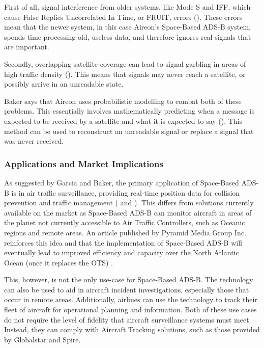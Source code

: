 \documentclass[stu, a4paper, 12pt, floatsintext]{apa7}
\numberwithin{figure}{section}
\numberwithin{table}{section}
\numberwithin{equation}{section}
\begin{document}
First of all, signal interference from older systems, like Mode S and IFF, which cause False Replies Uncorrelated In Time, or FRUIT, errors (\cite{AireonSpaceBasedADSBPerformanceModel}). These errors mean that the newer system, in this case Aireon’s Space-Based ADS-B system, spends time processing old, useless data, and therefore ignores real signals that are important. 

Secondly, overlapping satellite coverage can lead to signal garbling in areas of high traffic density (\cite{AireonSpaceBasedADSBPerformanceModel}). This means that signals may never reach a satellite, or possibly arrive in an unreadable state. 

Baker says that Aireon uses probabilistic modelling to combat both of these problems. This essentially involves mathematically predicting when a message is expected to be received by a satellite and what it is expected to say (\cite{SpaceBasedADSBPerformanceArchitectureAndMarket}). This method can be used to reconstruct an unreadable signal or replace a signal that was never received. 


\subsubsection{Applications and Market Implications}
As suggested by Garcia and Baker, the primary application of Space-Based ADS-B is in air traffic surveillance, providing real-time position data for collision prevention and traffic management (\cite{SpaceBasedADSBPerformanceArchitectureAndMarket} and \cite{AireonSpaceBasedADSBPerformanceModel}). This differs from solutions currently available on the market as Space-Based ADS-B can monitor aircraft in areas of the planet not currently accessible to Air Traffic Controllers, such as Oceanic regions and remote areas. An article published by Pyramid Media Group Inc. reinforces this idea and that the implementation of Space-Based ADS-B will eventually lead to improved efficiency and capacity over the North Atlantic Ocean (once it replaces the OTS) \cite{SpaceBasedADSBChangesFlying}. 

This, however, is not the only use-case for Space-Based ADS-B. The technology can also be used to aid in aircraft incident investigations, especially those that occur in remote areas. Additionally, airlines can use the technology to track their fleet of aircraft for operational planning and information. Both of these use cases do not require the level of fidelity that aircraft surveillance systems must meet. Instead, they can comply with Aircraft Tracking solutions, such as those provided by Globalstar and Spire.  
\end{document}

